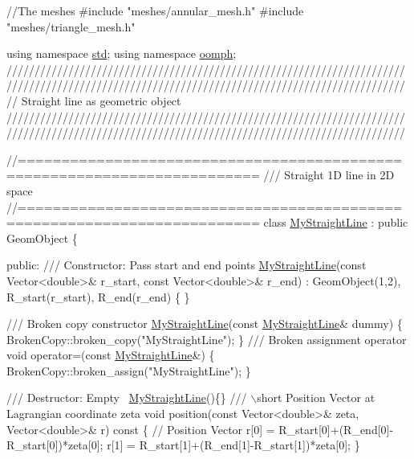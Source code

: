\begin{DoxyCodeInclude}
\textcolor{comment}{//The meshes}
\textcolor{preprocessor}{#include "meshes/annular\_mesh.h"}
\textcolor{preprocessor}{#include "meshes/triangle\_mesh.h"}

\textcolor{keyword}{using namespace }\hyperlink{namespacestd}{std};
\textcolor{keyword}{using namespace }\hyperlink{namespaceoomph}{oomph};
\textcolor{comment}{}
\textcolor{comment}{///////////////////////////////////////////////////////////////////////}
\textcolor{comment}{///////////////////////////////////////////////////////////////////////}
\textcolor{comment}{}\textcolor{comment}{// Straight line as geometric object}\textcolor{comment}{}
\textcolor{comment}{///////////////////////////////////////////////////////////////////////}
\textcolor{comment}{///////////////////////////////////////////////////////////////////////}
\textcolor{comment}{}


\textcolor{comment}{//=========================================================================}\textcolor{comment}{}
\textcolor{comment}{/// Straight 1D line in 2D space }
\textcolor{comment}{}\textcolor{comment}{//=========================================================================}
\textcolor{keyword}{class }\hyperlink{classMyStraightLine}{MyStraightLine} : \textcolor{keyword}{public} GeomObject
\{

\textcolor{keyword}{public}:
\textcolor{comment}{}
\textcolor{comment}{ /// Constructor:  Pass start and end points}
\textcolor{comment}{} \hyperlink{classMyStraightLine}{MyStraightLine}(\textcolor{keyword}{const} Vector<double>& r\_start, \textcolor{keyword}{const} Vector<double>& r\_end) 
  :  GeomObject(1,2), R\_start(r\_start), R\_end(r\_end)
  \{ \}

\textcolor{comment}{}
\textcolor{comment}{ /// Broken copy constructor}
\textcolor{comment}{} \hyperlink{classMyStraightLine}{MyStraightLine}(\textcolor{keyword}{const} \hyperlink{classMyStraightLine}{MyStraightLine}& dummy) 
  \{ 
   BrokenCopy::broken\_copy(\textcolor{stringliteral}{"MyStraightLine"});
  \} 
 \textcolor{comment}{}
\textcolor{comment}{ /// Broken assignment operator}
\textcolor{comment}{} \textcolor{keywordtype}{void} operator=(\textcolor{keyword}{const} \hyperlink{classMyStraightLine}{MyStraightLine}&) 
  \{
   BrokenCopy::broken\_assign(\textcolor{stringliteral}{"MyStraightLine"});
  \}

\textcolor{comment}{}
\textcolor{comment}{ /// Destructor:  Empty}
\textcolor{comment}{} ~\hyperlink{classMyStraightLine}{MyStraightLine}()\{\}
 \textcolor{comment}{}
\textcolor{comment}{ /// \(\backslash\)short Position Vector at Lagrangian coordinate zeta }
\textcolor{comment}{} \textcolor{keywordtype}{void} position(\textcolor{keyword}{const} Vector<double>& zeta, Vector<double>& r)\textcolor{keyword}{ const}
\textcolor{keyword}{  }\{
   \textcolor{comment}{// Position Vector}
   r[0] = R\_start[0]+(R\_end[0]-R\_start[0])*zeta[0];
   r[1] = R\_start[1]+(R\_end[1]-R\_start[1])*zeta[0];
  \}
 

\end{DoxyCodeInclude}
